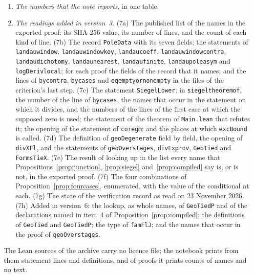 \documentclass[11pt]{article}
\theoremstyle{definition}
\theoremstyle{remark}
\DeclareRobustCommand{\lean}[1]{{\renewcommand{\_}{\textunderscore\allowbreak}\texttt{#1}}}
\begin{document}
\begin{enumerate}[leftmargin=2em,itemsep=1pt]
\item \emph{The numbers that the note reports}, in one table.
\item \emph{The readings added in version~3.} (7a) The published list of the names in the exported proof: its SHA-256 value, its number of lines, and the count of each kind of line. (7b) The record \lean{PoleData} with its seven fields; the statements of \lean{landau\_window}, \lean{landau\_window\_key}, \lean{landau\_coeff}, \lean{landau\_window\_contra}, \lean{landau\_dichotomy}, \lean{landau\_nearest}, \lean{landau\_finite}, \lean{landau\_pole\_asym} and \lean{logDeriv\_local}; for each proof the fields of the record that it names; and the lines of \lean{by\_contra}, \lean{by\_cases} and \lean{eq\_empty\_or\_nonempty} in the files of the criterion's last step. (7c) The statement \lean{SiegelLower}; in \lean{siegel\_theorem\_of}, the number of the line of \lean{by\_cases}, the names that occur in the statement on which it divides, and the numbers of the lines of the first case at which the supposed zero is used; the statement of the theorem of \lean{Main.lean} that refutes it; the opening of the statement of \lean{core\_gm}; and the places at which \lean{excBound} is called. (7d) The definition of \lean{geoDegenerate} field by field, the opening of \lean{divXFl}, and the statements of \lean{geoOver\_stages}, \lean{divEx\_prov}, \lean{GeoTied} and \lean{FormsTieX}. (7e) The result of looking up in the list every name that Propositions~\ref{prop:junction}, \ref{prop:siegel} and~\ref{prop:compiled} say is, or is not, in the exported proof. (7f) The four combinations of Proposition~\ref{prop:fourcases}, enumerated, with the value of the conditional at each. (7g) The state of the verification record as read on 23 November 2026. (7h) Added in version~6: the lookup, as whole names, of \lean{GeoTiedP} and of the declarations named in item~4 of Proposition~\ref{prop:compiled}; the definitions of \lean{GeoTied} and \lean{GeoTiedP}; the type of \lean{famFlJ}; and the names that occur in the proof of \lean{geoOver\_stages}.
\end{enumerate}
The Lean sources of the archive carry no licence file; the notebook prints from them statement lines and definitions, and of proofs it prints counts of names and no text.
\end{document}
